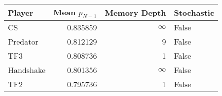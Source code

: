 \begin{tabular}{lrrl}
\toprule
    Player &  Mean $p_{N-1}$ &  Memory Depth & Stochastic \\
\midrule
        CS &        0.835859 &            \(\infty\) &      False \\
  Predator &        0.812129 &             9 &      False \\
       TF3 &        0.808736 &             1 &      False \\
 Handshake &        0.801356 &            \(\infty\) &      False \\
       TF2 &        0.795736 &             1 &      False \\
\bottomrule
\end{tabular}
